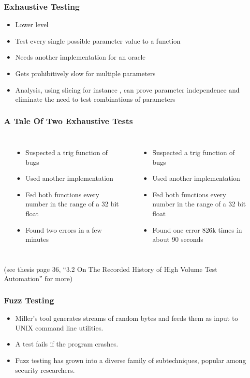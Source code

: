 \begin{frame}
  \frametitle{Exhaustive Testing}
  \begin{itemize}
    \item Lower level
    \item Test every single possible parameter value to a function
    \item Needs another implementation for an oracle
    \item Gets prohibitively slow for multiple parameters
    \item Analysis, using slicing for instance \citep{gallagher1991using}, can prove parameter independence and eliminate the need to test combinations of parameters
  \end{itemize}
\end{frame}

\begin{frame}
\frametitle{A Tale Of Two Exhaustive Tests}
\begin{columns}[c]
    \textbf{\citet{hoffman2003Exhausting}}
    \begin{itemize}
      \item Suspected a trig function of bugs
      \item Used another implementation
      \item Fed both functions every number in the range of a 32 bit float
      \item Found two errors in a few minutes
    \end{itemize}
    \textbf{\citet{dawsonFourBillion}}
    \begin{itemize}
      \item Suspected a trig function of bugs
      \item Used another implementation
      \item Fed both functions every number in the range of a 32 bit float
      \item Found one error 826k times in about 90 seconds
    \end{itemize}
\end{columns}
\vspace{1.0em}
(see thesis page 36, ``3.2 On The Recorded History of High Volume Test Automation'' for more)
\end{frame}

\begin{frame}
  \frametitle{Fuzz Testing}
  \begin{itemize}
    \item Miller's tool generates streams of random bytes and feeds them as input to UNIX command line utilities. \citep{miller1990empirical}
    \item A test fails if the program crashes.
    \item Fuzz testing has grown into a diverse family of subtechniques, popular among security researchers.
  \end{itemize}
\end{frame}

